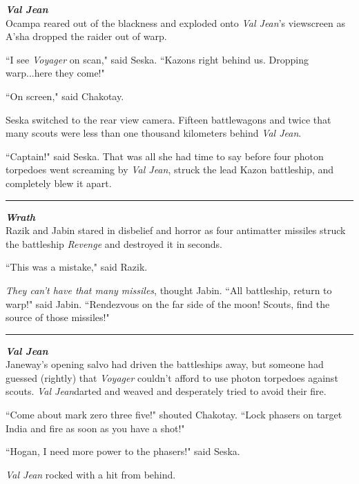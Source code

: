 \documentclass[twoside,letterpaper,12pt]{memoir}
\begin{document}
\noindent\textit{\textbf{Val Jean}}\\

Ocampa reared out of the blackness and exploded onto \textit{Val Jean}'s viewscreen as A'sha dropped the raider out of warp.

``I see \textit{Voyager} on scan," said Seska. ``Kazons right behind us. Dropping warp...here they come!"

``On screen," said Chakotay.

Seska switched to the rear view camera. Fifteen battlewagons and twice that many scouts were less than one thousand kilometers behind \textit{Val Jean}.

``Captain!" said Seska. That was all she had time to say before four photon torpedoes went screaming by \textit{Val Jean}, struck the lead Kazon battleship, and completely blew it apart.

\begin{center}\rule{3cm}{0.4 pt}\end{center}

\noindent\textit{\textbf{Wrath}}\\

Razik and Jabin stared in disbelief and horror as four antimatter missiles struck the battleship \textit{Revenge} and destroyed it in seconds.

``This was a mistake," said Razik.

\textit{They can't have that many missiles}, thought Jabin. ``All battleship, return to warp!" said Jabin. ``Rendezvous on the far side of the moon! Scouts, find the source of those missiles!"

\begin{center}\rule{3cm}{0.4 pt}\end{center}

\noindent\textit{\textbf{Val Jean}}\\

Janeway's opening salvo had driven the battleships away, but someone had guessed (rightly) that \textit{Voyager} couldn't afford to use photon torpedoes against scouts. \textit{Val Jean}darted and weaved and desperately tried to avoid their fire.

``Come about mark zero three five!" shouted Chakotay. ``Lock phasers on target India and fire as soon as you have a shot!"

``Hogan, I need more power to the phasers!" said Seska.

\textit{Val Jean} rocked with a hit from behind.
\end{document}

